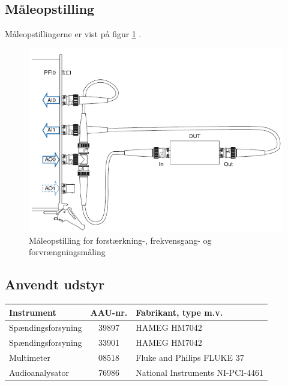 \subsection*{Måleopstilling}
Måleopstillingerne er vist på figur \ref{fig:indgang:maaleop-thd} .

\begin{figure}[h]
\centering
\includegraphics[scale=0.4]{maaleopstilling-thd-forforstaerker.png}
\caption{Måleopstilling for forstærkning-, frekvensgang- og forvrængningsmåling}
\label{fig:indgang:maaleop-thd}
\end{figure}


\subsection*{Anvendt udstyr}

\begin{table}[h]
\centering
\begin{tabular}{l|c|l}
\hline\hline
Instrument & AAU-nr. & Fabrikant, type m.v. \\
\hline\hline
Spændingsforsyning & 39897 & HAMEG HM7042 \\[4pt]
Spændingsforsyning & 33901 & HAMEG HM7042 \\[4pt]
Multimeter & 08518 & Fluke and Philips FLUKE 37 \\[4pt]
Audioanalysator & 76986 & National Instruments NI-PCI-4461 \\
\hline\hline
\end{tabular}
\label{tab:indgang:maaleudstyr_forforstaerker}
\end{table}


